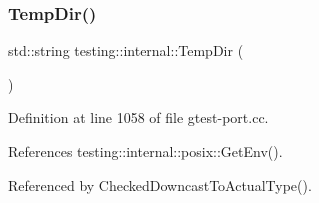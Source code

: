 \subsubsection{\texorpdfstring{Temp\+Dir()}{TempDir()}}
{\footnotesize\ttfamily std\+::string testing\+::internal\+::\+Temp\+Dir (\begin{DoxyParamCaption}{ }\end{DoxyParamCaption})}



Definition at line 1058 of file gtest-\/port.\+cc.



References testing\+::internal\+::posix\+::\+Get\+Env().



Referenced by Checked\+Downcast\+To\+Actual\+Type().


